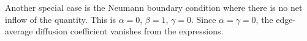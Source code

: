 Another special case is the Neumann boundary condition where there is no net inflow of the quantity. This is $\alpha = 0$, $\beta = 1$, $\gamma = 0$. Since $\alpha = \gamma = 0$, the edge-average diffusion coefficient vanishes from the expressions.



%
%
%
%
%
%
